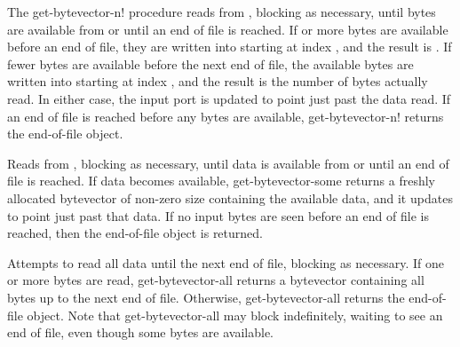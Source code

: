 \begin{entry}{%
}

   
The {\cf get-bytevector-n!} procedure reads from ,
blocking as necessary, until
 bytes are available from  or until
an end of file is
reached. If  or more bytes are available before an end of file,
they are written into  starting at index , and
the result is . If fewer bytes are available before
the next end of file, the available bytes are written into 
starting at index , and the result is the number of bytes actually
read. In either case, the input port is updated to point just past the
data read. If an end of file is reached before any bytes
are available, {\cf get-bytevector-n!} returns the end-of-file object.
\end{entry}

\begin{entry}{%
}
   
Reads from , blocking as necessary, until data is
available from  or until an end of file is reached.
If data becomes available,
{\cf get-bytevector-some} returns a freshly allocated
bytevector of non-zero size containing the available data, and it updates
 to point just past that data.
If no input bytes are seen before an end
of file is reached, then the end-of-file object is returned.
\end{entry}

\begin{entry}{%
}
   
Attempts to read all data until the next end of file, blocking as
necessary. If one or more bytes are read, {\cf get-bytevector-all} returns
a bytevector
containing all bytes up to the next end of file.  Otherwise, {\cf
  get-bytevector-all} returns the end-of-file object.
Note that  {\cf get-bytevector-all}
may block indefinitely, waiting to see an end of
file, even though some bytes are available.
\end{entry}

